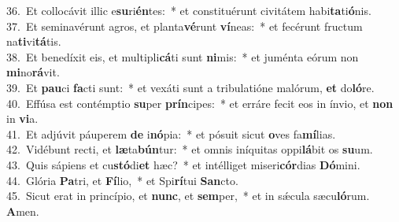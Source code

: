 {36.~}Et collocávit illic e\textbf{su}ri\textbf{én}tes:~* et constituérunt civitátem habi\textbf{ta}ti\textbf{ó}nis.\\
{37.~}Et seminavérunt agros, et planta\textbf{vé}runt \textbf{ví}neas:~* et fecérunt fructum na\textbf{ti}vi\textbf{tá}tis.\\
{38.~}Et benedíxit eis, et multipli\textbf{cá}ti sunt \textbf{ni}mis:~* et juménta eórum non \textbf{mi}no\textbf{rá}vit.\\
{39.~}Et \textbf{pau}ci \textbf{fa}cti sunt:~* et vexáti sunt a tribulatióne malórum, \textbf{et} do\textbf{ló}re.\\
{40.~}Effúsa est contémptio \textbf{su}per \textbf{prín}cipes:~* et erráre fecit eos in ínvio, et \textbf{non} in \textbf{vi}a.\\
{41.~}Et adjúvit páuperem \textbf{de} i\textbf{nó}pia:~* et pósuit sicut \textbf{o}ves fa\textbf{mí}lias.\\
{42.~}Vidébunt recti, et \textbf{læ}ta\textbf{bún}tur:~* et omnis iníquitas oppi\textbf{lá}bit os \textbf{su}um.\\
{43.~}Quis sápiens et cu\textbf{stó}di\textbf{et} hæc?~* et intélliget miseri\textbf{cór}dias \textbf{Dó}mini.\\
{44.~}Glória \textbf{Pa}tri, et \textbf{Fí}lio,~* et Spi\textbf{rí}tui \textbf{San}cto.\\
{45.~}Sicut erat in princípio, et \textbf{nunc}, et \textbf{sem}per,~* et in sǽcula sæcu\textbf{ló}rum. \textbf{A}men.\\
